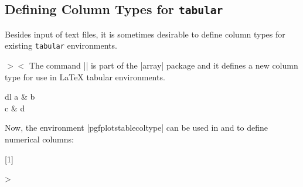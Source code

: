 \subsection{Defining Column Types for \texttt{tabular}}

Besides input of text files, it is sometimes desirable to define column types
for existing \texttt{tabular} environments.

\begin{command}{\newcolumntype{}$>$$<$
}
    The command |\newcolumntype| is part of the |array| package and it defines
    a new column type  for use in \LaTeX{} tabular environments.
\begin{codeexample}
\usepackage{array}
\end{codeexample}

\begin{codeexample}[pre={\begin{lateximage}},post={\end{lateximage}}]
\begin{tabular}{dl}
a & b \\
c & d \\
\end{tabular}
\end{codeexample}

    Now, the environment |pgfplotstablecoltype| can be used in  and  to define numerical columns:
\begin{codeexample}[pre={\begin{lateximage}},post={\end{lateximage}}]
\newcolumntype{L}[1]
    {>{\begin{pgfplotstablecoltype}[#1]}r<{\end{pgfplotstablecoltype}}}


\end{codeexample}
\end{command}
